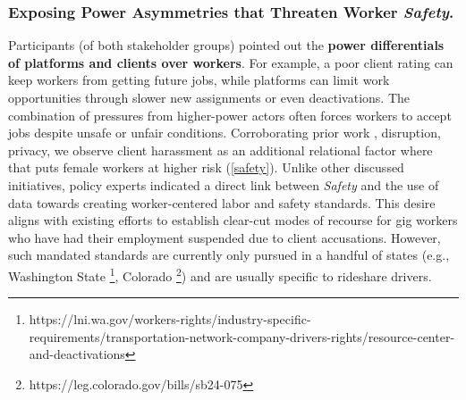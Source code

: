\subsubsection{\textbf{{Exposing Power Asymmetries that Threaten Worker \textit{Safety}}.}}
{Participants (of both stakeholder groups) pointed out the \textbf{power differentials of platforms and clients over workers}. For example, a poor client rating can keep workers from getting future jobs, while platforms can limit work opportunities through slower new assignments or even deactivations. The combination of pressures from higher-power actors often forces workers to accept jobs despite unsafe or unfair conditions. Corroborating prior work \cite{ma2022brush}, disruption, privacy}, we observe client harassment as an additional relational factor where that puts female workers at higher risk (\ref{safety}). 
%
Unlike other discussed initiatives, policy experts indicated a direct link between \textit{Safety} and the use of data towards creating worker-centered labor and safety standards. This desire aligns with existing efforts to establish clear-cut modes of recourse for gig workers who have had their employment suspended due to client accusations. However, such mandated standards are currently only pursued in a handful of states (e.g., Washington State \footnote{https://lni.wa.gov/workers-rights/industry-specific-requirements/transportation-network-company-drivers-rights/resource-center-and-deactivations}, Colorado \footnote{https://leg.colorado.gov/bills/sb24-075}) and are usually specific to rideshare drivers. 

